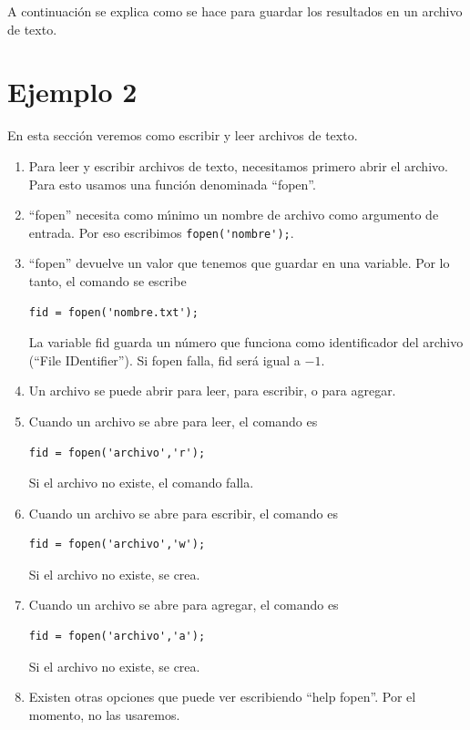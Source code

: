 A continuaci\'{o}n se explica como se hace para guardar los resultados
en un archivo de texto.

\section{Ejemplo 2}

En esta secci\'{o}n veremos como escribir y leer archivos de texto.

\begin{enumerate}
\item Para leer y escribir archivos de texto, necesitamos primero abrir el
archivo. Para esto usamos una funci\'{o}n denominada ``fopen''.

\item ``fopen'' necesita como m\'{\i}nimo un nombre de archivo como
  argumento de entrada. Por eso escribimos \verb-fopen('nombre');-.

\item ``fopen'' devuelve un valor que tenemos que guardar en una
  variable. Por lo tanto, el comando se escribe
\begin{verbatim}
fid = fopen('nombre.txt');
\end{verbatim}
La variable fid guarda un n\'{u}mero que funciona como identificador
del archivo (``File IDentifier''). Si fopen falla, fid ser\'{a} igual
a $-1$.

\item Un archivo se puede abrir para leer, para escribir, o
  para agregar.

\item Cuando un archivo se abre para leer, el comando es
\begin{verbatim}
fid = fopen('archivo','r');
\end{verbatim}
Si el archivo no existe, el comando falla.

\item Cuando un archivo se abre para escribir, el comando es
\begin{verbatim}
fid = fopen('archivo','w');
\end{verbatim}
Si el archivo no existe, se crea.

\item Cuando un archivo se abre para agregar, el comando es
\begin{verbatim}
fid = fopen('archivo','a');
\end{verbatim}
Si el archivo no existe, se crea.

\item Existen otras opciones que puede ver escribiendo ``help
  fopen''. Por el momento, no las usaremos.


\end{enumerate}
